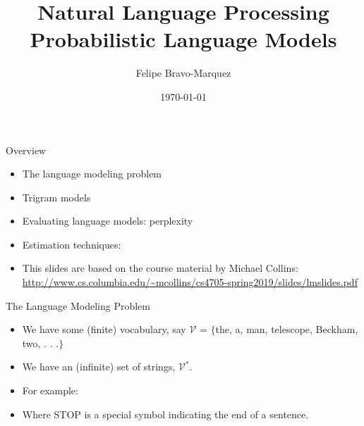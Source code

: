 \documentclass[handout]{beamer}
\title{Natural Language Processing \\ Probabilistic Language Models}
\author[Felipe Bravo Márquez]{\footnotesize
 \textcolor[rgb]{0.00,0.00,1.00}{Felipe Bravo-Marquez}}
\date{\today}
\begin{document}
\begin{frame}
\titlepage


\end{frame}



\begin{frame}{Overview}
\begin{scriptsize}
\begin{itemize}
\item The language modeling problem
\item Trigram models
\item Evaluating language models: perplexity
\item  Estimation techniques:
\item This slides are based on the course material by Michael Collins: \url{http://www.cs.columbia.edu/~mcollins/cs4705-spring2019/slides/lmslides.pdf} 

\end{itemize}
\end{scriptsize}
\end{frame}

\begin{frame}{The Language Modeling Problem}

\begin{scriptsize}
\begin{itemize}
\item We have some (finite) vocabulary, say $\mathcal{V}$ = $\{$the, a, man, telescope, Beckham, two, . . .$\}$
\item We have an (infinite) set of strings, $\mathcal{V}^*$.
\item For example: 
\item Where STOP is a special symbol indicating the end of a sentence.

\end{itemize}
\end{scriptsize}

\end{frame}
\end{document}
